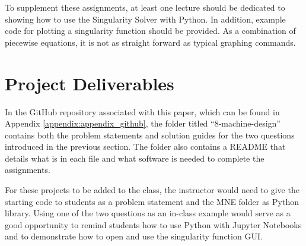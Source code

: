 To supplement these assignments, at least one lecture should be dedicated to showing how to use the Singularity 
Solver with Python. In addition, example code for plotting a singularity function should be provided. As a 
combination of piecewise equations, it is not as straight forward as typical graphing commands.

\section{Project Deliverables}

In the GitHub repository associated with this paper, which can be found in Appendix \ref{appendix:appendix_github},
the folder titled ``8-machine-design'' contains both the problem statements and solution guides for the two questions
introduced in the previous section. The folder also contains a README that details what is in each file and 
what software is needed to complete the assignments. 

For these projects to be added to the class, the instructor would  need to give the starting code to 
students as a problem statement and the MNE folder as Python library. Using one of the two questions as an in-class
example would serve as a good opportunity to remind students how to use Python with Jupyter Notebooks and to 
demonstrate how to open and use the singularity function GUI.
